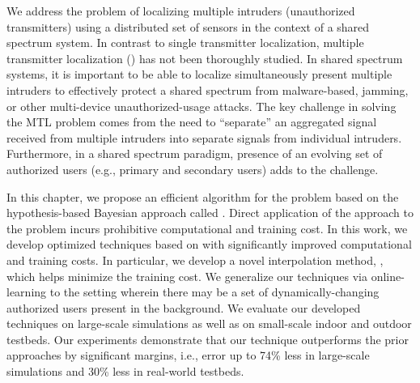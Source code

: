 We address the problem of localizing multiple intruders (unauthorized
transmitters) using a distributed set of sensors in the context of a
shared spectrum system. 
In contrast to single transmitter localization, multiple
transmitter localization (\mtl) has not been thoroughly studied.
In shared spectrum systems, it is important to be able to
localize simultaneously present multiple intruders to effectively
protect a shared spectrum from malware-based, jamming, or other
multi-device unauthorized-usage attacks. The key challenge in solving
the MTL problem comes from the need to ``separate'' an aggregated
signal received from multiple intruders into separate
signals from individual intruders. Furthermore, in a shared spectrum
paradigm, presence of an evolving set of authorized users (e.g.,
primary and secondary users) adds to the challenge.

In this chapter, we propose an efficient algorithm for the \mtl problem
based on the hypothesis-based Bayesian approach called
\map. Direct application of the \map approach to
the \mtl problem incurs prohibitive computational and training
cost. In this work, we develop optimized techniques based on \map with
significantly improved computational and training costs. In
particular, we develop a novel interpolation method, \ildw, which helps
minimize the training cost. We generalize our techniques via
online-learning to the setting wherein there may be a set of
dynamically-changing authorized users present in the background.
We evaluate our developed techniques on large-scale simulations as
well as on small-scale indoor and outdoor testbeds. Our experiments
demonstrate that our technique outperforms the prior approaches by
significant margins,  i.e., error up to 74\% less in large-scale simulations and 30\% less in real-world testbeds.


